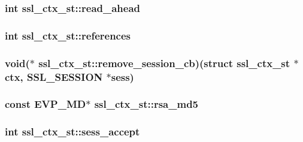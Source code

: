 \hypertarget{structssl__ctx__st_a454cbb1294b6b36ab36cff39c541ba70}{
\subsubsection[{read\-\_\-ahead}]{\setlength{\rightskip}{0pt plus 5cm}int ssl\-\_\-ctx\-\_\-st\-::read\-\_\-ahead}}\label{structssl__ctx__st_a454cbb1294b6b36ab36cff39c541ba70}
\hypertarget{structssl__ctx__st_aaefa58bdf5771d0ae34e05dbc372f6c3}{
\subsubsection[{references}]{\setlength{\rightskip}{0pt plus 5cm}int ssl\-\_\-ctx\-\_\-st\-::references}}\label{structssl__ctx__st_aaefa58bdf5771d0ae34e05dbc372f6c3}
\hypertarget{structssl__ctx__st_a82fef836aeedd6eabb09c4443f8897de}{
\subsubsection[{remove\-\_\-session\-\_\-cb}]{\setlength{\rightskip}{0pt plus 5cm}void($\ast$ ssl\-\_\-ctx\-\_\-st\-::remove\-\_\-session\-\_\-cb)(struct {\bf ssl\-\_\-ctx\-\_\-st} $\ast${\bf ctx}, {\bf S\-S\-L\-\_\-\-S\-E\-S\-S\-I\-O\-N} $\ast$sess)}}\label{structssl__ctx__st_a82fef836aeedd6eabb09c4443f8897de}
\hypertarget{structssl__ctx__st_a297d3bf2019076959d84c41a41e7ac3b}{
\subsubsection[{rsa\-\_\-md5}]{\setlength{\rightskip}{0pt plus 5cm}const E\-V\-P\-\_\-\-M\-D$\ast$ ssl\-\_\-ctx\-\_\-st\-::rsa\-\_\-md5}}\label{structssl__ctx__st_a297d3bf2019076959d84c41a41e7ac3b}
\hypertarget{structssl__ctx__st_aba3d064c61173796e66924d878fc2b8a}{
\subsubsection[{sess\-\_\-accept}]{\setlength{\rightskip}{0pt plus 5cm}int ssl\-\_\-ctx\-\_\-st\-::sess\-\_\-accept}}\label{structssl__ctx__st_aba3d064c61173796e66924d878fc2b8a}
